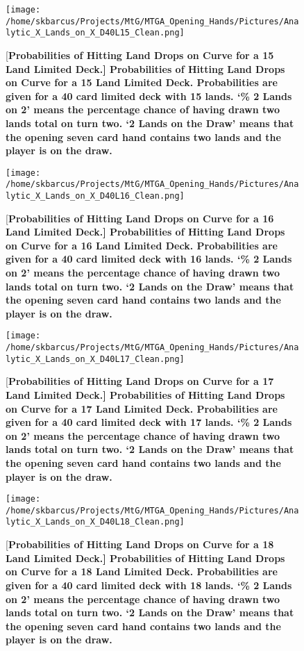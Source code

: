 \documentclass[oneside]{book}   %
\begin{document}
	\begin{figure}[!ht]
	\centering
	\centerline{\texttt{[image: /home/skbarcus/Projects/MtG/MTGA\_Opening\_Hands/Pictures/Analytic\_X\_Lands\_on\_X\_D40L15\_Clean.png]}}
	[\bf{Probabilities of Hitting Land Drops on Curve for a 15 Land Limited Deck.}]{
	{\bf{Probabilities of Hitting Land Drops on Curve for a 15 Land Limited Deck.}} Probabilities are given for a 40 card limited deck with 15 lands. `\% 2 Lands on 2' means the percentage chance of having drawn two lands total on turn two. `2 Lands on the Draw' means that the opening seven card hand contains two lands and the player is on the draw.}
	\label{fig:15_curve}
	\end{figure}	
	
	\begin{figure}[!ht]
	\centering
	\centerline{\texttt{[image: /home/skbarcus/Projects/MtG/MTGA\_Opening\_Hands/Pictures/Analytic\_X\_Lands\_on\_X\_D40L16\_Clean.png]}}
	[\bf{Probabilities of Hitting Land Drops on Curve for a 16 Land Limited Deck.}]{
	{\bf{Probabilities of Hitting Land Drops on Curve for a 16 Land Limited Deck.}} Probabilities are given for a 40 card limited deck with 16 lands. `\% 2 Lands on 2' means the percentage chance of having drawn two lands total on turn two. `2 Lands on the Draw' means that the opening seven card hand contains two lands and the player is on the draw.}
	\label{fig:16_curve}
	\end{figure}	
	
	\begin{figure}[!ht]
	\centering
	\centerline{\texttt{[image: /home/skbarcus/Projects/MtG/MTGA\_Opening\_Hands/Pictures/Analytic\_X\_Lands\_on\_X\_D40L17\_Clean.png]}}
	[\bf{Probabilities of Hitting Land Drops on Curve for a 17 Land Limited Deck.}]{
	{\bf{Probabilities of Hitting Land Drops on Curve for a 17 Land Limited Deck.}} Probabilities are given for a 40 card limited deck with 17 lands. `\% 2 Lands on 2' means the percentage chance of having drawn two lands total on turn two. `2 Lands on the Draw' means that the opening seven card hand contains two lands and the player is on the draw.}
	\label{fig:17_curve}
	\end{figure}	
	
	\begin{figure}[!ht]
	\centering
	\centerline{\texttt{[image: /home/skbarcus/Projects/MtG/MTGA\_Opening\_Hands/Pictures/Analytic\_X\_Lands\_on\_X\_D40L18\_Clean.png]}}
	[\bf{Probabilities of Hitting Land Drops on Curve for a 18 Land Limited Deck.}]{
	{\bf{Probabilities of Hitting Land Drops on Curve for a 18 Land Limited Deck.}} Probabilities are given for a 40 card limited deck with 18 lands. `\% 2 Lands on 2' means the percentage chance of having drawn two lands total on turn two. `2 Lands on the Draw' means that the opening seven card hand contains two lands and the player is on the draw.}
	\label{fig:18_curve}
	\end{figure}	
	
\end{document}
